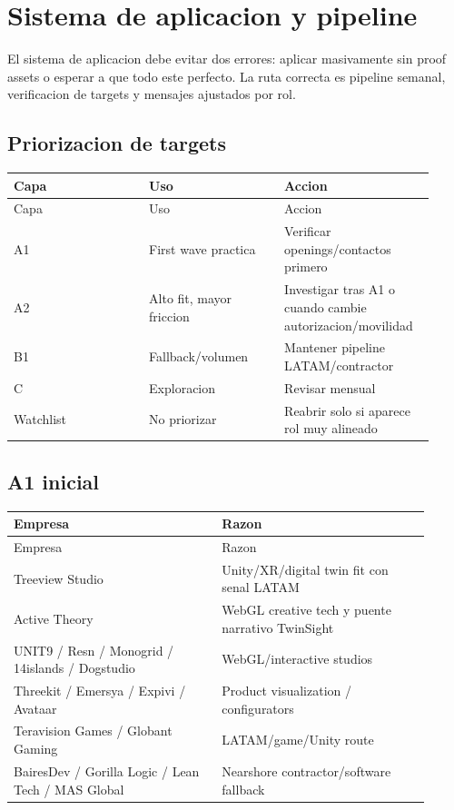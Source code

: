 \chapter{Sistema de aplicacion y pipeline}


El sistema de aplicacion debe evitar dos errores: aplicar masivamente sin proof assets o esperar a que todo este perfecto. La ruta correcta es pipeline semanal, verificacion de targets y mensajes ajustados por rol.


\section{Priorizacion de targets}


\begin{center}
\scriptsize
\begin{longtable}{>{\raggedright\arraybackslash}p{0.305\linewidth} >{\raggedright\arraybackslash}p{0.305\linewidth} >{\raggedright\arraybackslash}p{0.305\linewidth}}
\toprule
Capa & Uso & Accion \\
\midrule
\endfirsthead
\toprule
Capa & Uso & Accion \\
\midrule
\endhead
A1 & First wave practica & Verificar openings/contactos primero \\
A2 & Alto fit, mayor friccion & Investigar tras A1 o cuando cambie autorizacion/movilidad \\
B1 & Fallback/volumen & Mantener pipeline LATAM/contractor \\
C & Exploracion & Revisar mensual \\
Watchlist & No priorizar & Reabrir solo si aparece rol muy alineado \\
\bottomrule
\end{longtable}
\end{center}


\section{A1 inicial}


\begin{center}
\scriptsize
\begin{longtable}{>{\raggedright\arraybackslash}p{0.455\linewidth} >{\raggedright\arraybackslash}p{0.455\linewidth}}
\toprule
Empresa & Razon \\
\midrule
\endfirsthead
\toprule
Empresa & Razon \\
\midrule
\endhead
Treeview Studio & Unity/XR/digital twin fit con senal LATAM \\
Active Theory & WebGL creative tech y puente narrativo TwinSight \\
UNIT9 / Resn / Monogrid / 14islands / Dogstudio & WebGL/interactive studios \\
Threekit / Emersya / Expivi / Avataar & Product visualization / configurators \\
Teravision Games / Globant Gaming & LATAM/game/Unity route \\
BairesDev / Gorilla Logic / Lean Tech / MAS Global & Nearshore contractor/software fallback \\
\bottomrule
\end{longtable}
\end{center}


